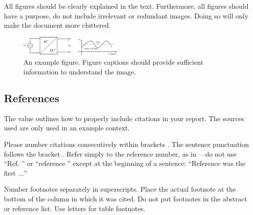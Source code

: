 All figures should be clearly explained in the text. Furthermore, all figures should have a purpose, do not include irrelevant or redundant images. Doing so will only make the document more cluttered.



\begin{figure}[H]
    \centering
	\includegraphics[width = 0.45\textwidth]{figures/19.pdf}
	\caption{An example figure. Figure captions should provide sufficient information to understand the image.}
    \label{fig:myOtherSampleFigure}
\end{figure}











\subsection{References}
The value outlines how to properly include citations in your report. The sources used are only used in an example context.

Please number citations consecutively within brackets \cite{halter2008electrical}. The sentence punctuation follows the bracket \cite{jossinet1998impedivity}. Refer simply to the reference number, as in \cite{cole1941dispersion}---do not use ``Ref. \cite{cole1941dispersion}'' or ``reference \cite{cole1941dispersion}'' except at the beginning of a sentence: ``Reference \cite{cole1941dispersion} was the first $\ldots$''



Number footnotes separately in superscripts. Place the actual footnote at 
the bottom of the column in which it was cited. Do not put footnotes in the 
abstract or reference list. Use letters for table footnotes.



